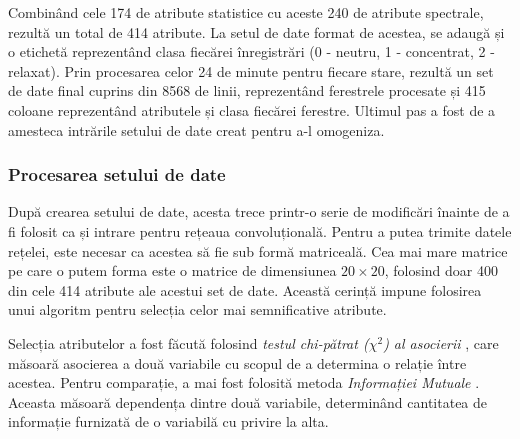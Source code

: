 Combinând cele 174 de atribute statistice cu aceste 240 de atribute spectrale, rezultă un total de 414 atribute. La setul de date format de acestea, se adaugă și o etichetă reprezentând clasa fiecărei înregistrări (0 - neutru, 1 - concentrat, 2 - relaxat). Prin procesarea celor 24 de minute pentru fiecare stare, rezultă un set de date final cuprins din 8568 de linii, reprezentând ferestrele procesate și 415 coloane reprezentând atributele și clasa fiecărei ferestre. Ultimul pas a fost de a amesteca intrările setului de date creat pentru a-l omogeniza.

\subsubsection*{Procesarea setului de date}\label{ssch:procesare-date}
După crearea setului de date, acesta trece printr-o serie de modificări înainte de a fi folosit ca și intrare pentru rețeaua convoluțională. Pentru a putea trimite datele rețelei, este necesar ca acestea să fie sub formă matriceală. Cea mai mare matrice pe care o putem forma este o matrice de dimensiunea $20\times20$, folosind doar 400 din cele 414 atribute ale acestui set de date. Această cerință impune folosirea unui algoritm pentru selecția celor mai semnificative atribute.

Selecția atributelor a fost făcută folosind \textit{testul chi-pătrat ($\chi^2$) al asocierii} \cite{online:chi-squared-pdf}, care măsoară asocierea a două variabile cu scopul de a determina o relație între acestea. Pentru comparație, a mai fost folosită metoda \textit{Informației Mutuale} \cite{online:info-mutuala}. Aceasta măsoară dependența dintre două variabile, determinând cantitatea de informație furnizată de o variabilă cu privire la alta.

